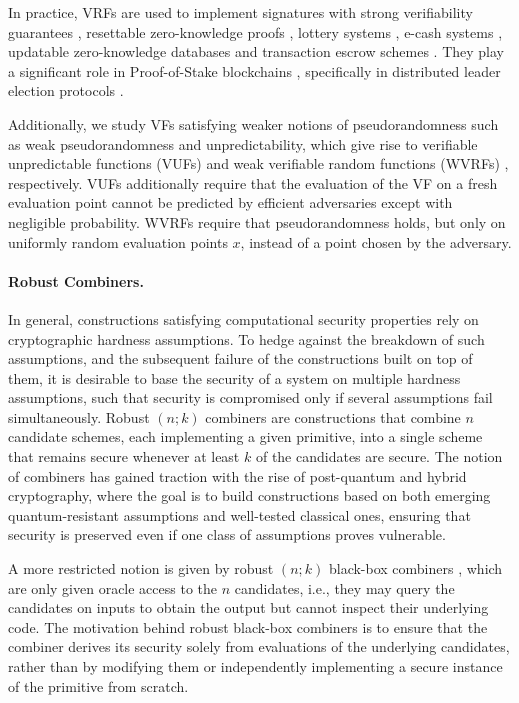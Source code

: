 In practice, VRFs are used to implement signatures with strong verifiability guarantees \cite{C:GolOst92},
resettable zero-knowledge proofs \cite{C:MicRey01}, lottery systems \cite{RSA:MicRiv02a,cryptography4040037}, e-cash systems \cite{ACISP:AuSusMu07,PAIRING:BCKL09},
updatable zero-knowledge databases \cite{AC:Liskov05} and transaction escrow schemes \cite{EC:JarShm04}. They play a significant 
role in Proof-of-Stake blockchains \cite{C:KRDO17,EC:DGKR18}, specifically in distributed leader election protocols \cite{EPRINT:BASV23b}.

Additionally, we study VFs satisfying weaker notions of pseudorandomness such as 
weak pseudorandomness and unpredictability, which give rise to verifiable unpredictable functions 
(VUFs) \cite{FOCS:MicRabVad99} and weak verifiable random functions (WVRFs) \cite{TCC:BGRV09}, respectively. VUFs additionally require that 
the evaluation of the VF on a fresh evaluation point cannot be predicted by efficient adversaries 
except with negligible probability. WVRFs require that pseudorandomness holds, but only on 
uniformly random evaluation points $x$, instead of a point chosen by the adversary.

\paragraph{Robust Combiners.} 
In general, constructions satisfying computational security properties rely on cryptographic hardness assumptions.
To hedge against the breakdown of such assumptions, and the subsequent failure of the constructions built on top of them,
it is desirable to base the security of a system on multiple hardness assumptions, such that security is compromised only if several assumptions fail simultaneously.
Robust $(n;k)$ combiners \cite{EC:HKNRR05} are constructions that combine $n$ candidate schemes, 
each implementing a given primitive, into a single scheme that remains secure whenever at least $k$ of the candidates are secure.
The notion of combiners has gained traction with the rise of post-quantum and hybrid cryptography, where the goal is to build 
constructions based on both emerging quantum-resistant assumptions and well-tested classical ones, ensuring that security is preserved 
even if one class of assumptions proves vulnerable.
 
A more restricted notion is given by robust $(n;k)$ black-box combiners \cite{EC:HKNRR05},
which are only given oracle access to the $n$ candidates, i.e., they may query the candidates 
on inputs to obtain the output but cannot inspect their underlying code. 
The motivation behind robust black-box combiners is to ensure that the combiner derives its security solely
from evaluations of the underlying candidates, rather than by modifying them or independently implementing a secure instance of the primitive
from scratch. 

